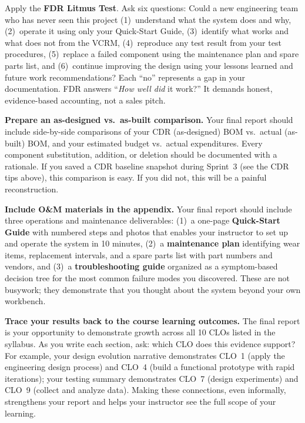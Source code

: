 \begin{faqbox}
Apply the \textbf{FDR Litmus Test}. Ask six questions: Could a new engineering team who has never seen this project (1)~understand what the system does and why, (2)~operate it using only your Quick-Start Guide, (3)~identify what works and what does not from the VCRM, (4)~reproduce any test result from your test procedures, (5)~replace a failed component using the maintenance plan and spare parts list, and (6)~continue improving the design using your lessons learned and future work recommendations? Each ``no'' represents a gap in your documentation. FDR answers ``\textit{How well did} it work?'' It demands honest, evidence-based accounting, not a sales pitch.
\end{faqbox}

\begin{protip}
\textbf{Prepare an as-designed vs.\ as-built comparison.} Your final report should include side-by-side comparisons of your CDR (as-designed) BOM vs.\ actual (as-built) BOM, and your estimated budget vs.\ actual expenditures. Every component substitution, addition, or deletion should be documented with a rationale. If you saved a CDR baseline snapshot during Sprint~3 (see the CDR tips above), this comparison is easy. If you did not, this will be a painful reconstruction.
\end{protip}

\begin{tipbox}
\textbf{Include O\&M materials in the appendix.} Your final report should include three operations and maintenance deliverables: (1)~a one-page \textbf{Quick-Start Guide} with numbered steps and photos that enables your instructor to set up and operate the system in 10 minutes, (2)~a \textbf{maintenance plan} identifying wear items, replacement intervals, and a spare parts list with part numbers and vendors, and (3)~a \textbf{troubleshooting guide} organized as a symptom-based decision tree for the most common failure modes you discovered. These are not busywork; they demonstrate that you thought about the system beyond your own workbench.
\end{tipbox}

\begin{protip}
\textbf{Trace your results back to the course learning outcomes.} The final report is your opportunity to demonstrate growth across all 10 CLOs listed in the syllabus. As you write each section, ask: which CLO does this evidence support? For example, your design evolution narrative demonstrates CLO~1 (apply the engineering design process) and CLO~4 (build a functional prototype with rapid iterations); your testing summary demonstrates CLO~7 (design experiments) and CLO~9 (collect and analyze data). Making these connections, even informally, strengthens your report and helps your instructor see the full scope of your learning.
\end{protip}

